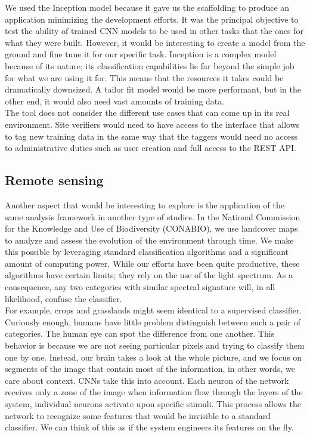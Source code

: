 We used the Inception model because it gave us the scaffolding to produce an application minimizing the development efforts. It was the principal objective to test the ability of trained CNN models to be used in other tasks that the ones for what they were built. However, it would be interesting to create a model from the ground and fine tune it for our specific task. Inception is a complex model because of its nature; its classification capabilities lie far beyond the simple job for what we are using it for. This means that the resources it takes could be dramatically downsized. A tailor fit model would be more performant, but in the other end, it would also need vast amounts of training data.\\

The tool does not consider the different use cases that can come up in its real environment. Site verifiers would need to have access to the interface that allows to tag new training data in the same way that the taggers would need no access to administrative duties such as user creation and full access to the REST API.\\

\subsection{Remote sensing}


Another aspect that would be interesting to explore is the application of the same analysis framework in another type of studies. In the National Commission for the Knowledge and Use of Biodiversity (CONABIO), we use landcover maps to analyze and assess the evolution of the environment through time. We make this possible by leveraging standard classification algorithms and a significant amount of computing power. While our efforts have been quite productive, these algorithms have certain limits; they rely on the use of the light spectrum. As a consequence, any two categories with similar spectral signature will, in all likelihood, confuse the classifier.\\

For example, crops and grasslands might seem identical to a supervised classifier. Curiously enough, humans have little problem distinguish between such a pair of categories. The human eye can spot the difference from one another. This behavior is because we are not seeing particular pixels and trying to classify them one by one. Instead, our brain takes a look at the whole picture, and we focus on segments of the image that contain most of the information, in other words, we care about context. CNNs take this into account. Each neuron of the network receives only a zone of the image when information flow through the layers of the system, individual neurons activate upon specific stimuli. This process allows the network to recognize some features that would be invisible to a standard classifier. We can think of this as if the system engineers its features on the fly.\\

